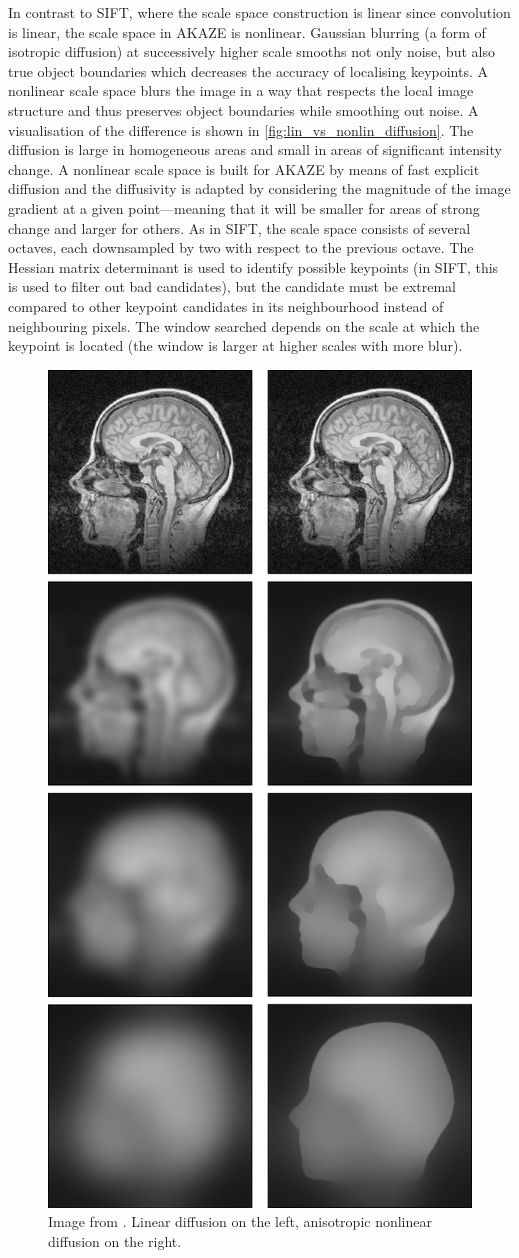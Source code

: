 In contrast to SIFT, where the scale space construction is linear since
convolution is linear, the scale space in AKAZE is nonlinear. Gaussian blurring
(a form of isotropic diffusion) at successively higher scale smooths not only
noise, but also true object boundaries which decreases the accuracy of
localising keypoints. A nonlinear scale space blurs the image in a way that
respects the local image structure and thus preserves object boundaries while
smoothing out noise. A visualisation of the difference is shown in
\autoref{fig:lin_vs_nonlin_diffusion}. The diffusion is large in homogeneous
areas and small in areas of significant intensity change.  A nonlinear scale
space is built for AKAZE by means of fast explicit diffusion
\citep{grewenig2010} and the diffusivity is adapted by considering the magnitude
of the image gradient at a given point---meaning that it will be smaller for
areas of strong change and larger for others. As in SIFT, the scale space
consists of several octaves, each downsampled by two with respect to the
previous octave. The Hessian matrix determinant is used to identify possible
keypoints (in SIFT, this is used to filter out bad candidates),  but the
candidate must be extremal compared to other keypoint candidates in its
neighbourhood instead of neighbouring pixels. The window searched depends on the
scale at which the keypoint is located (the window is larger at higher scales
with more blur).

\begin{figure}[h]
   {\centering      
      \includegraphics[width=.5\textwidth]{gfx/lin_vs_nonlin_diffusion2.png}
      \caption[Linear vs. nonlinear diffusion]{Image from \citep[p.120,121]{weickert1998}. Linear diffusion on the left,
   anisotropic nonlinear diffusion on the right.}
   \label{fig:lin_vs_nonlin_diffusion}}
\end{figure}

